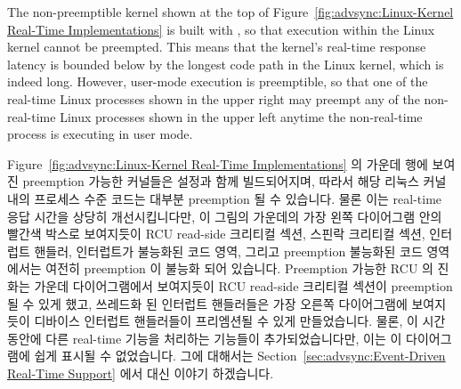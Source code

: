 The non-preemptible kernel shown at the top of
Figure~\ref{fig:advsync:Linux-Kernel Real-Time Implementations}
is built with , so that execution within the Linux
kernel cannot be preempted.
This means that the kernel's real-time response latency is bounded below
by the longest code path in the Linux kernel, which is indeed long.
However, user-mode execution is preemptible, so that one of the
real-time Linux processes shown in the upper right may preempt any of the
non-real-time Linux processes shown in the upper left anytime the
non-real-time process is executing in user mode.
\fi

Figure~\ref{fig:advsync:Linux-Kernel Real-Time Implementations}
의 가운데 행에 보여진 preemption 가능한 커널들은  설정과
함께 빌드되어지며, 따라서 해당 리눅스 커널 내의 프로세스 수준 코드는 대부분
preemption 될 수 있습니다.
물론 이는 real-time 응답 시간을 상당히 개선시킵니다만, 이 그림의 가운데의 가장
왼쪽 다이어그램 안의 빨간색 박스로 보여지듯이 RCU read-side 크리티컬 섹션,
스핀락 크리티컬 섹션, 인터럽트 핸들러, 인터럽트가 불능화된 코드 영역, 그리고
preemption 불능화된 코드 영역에서는 여전히 preemption 이 불능화 되어 있습니다.
Preemption 가능한 RCU 의 진화는 가운데 다이어그램에서 보여지듯이 RCU read-side
크리티컬 섹션이 preemption 될 수 있게 했고, 쓰레드화 된 인터럽트 핸들러들은
가장 오른쪽 다이어그램에 보여지듯이 디바이스 인터럽트 핸들러들이 프리엠션될 수
있게 만들었습니다.
물론, 이 시간 동안에 다른 real-time 기능을 처리하는 기능들이 추가되었습니다만,
이는 이 다이어그램에 쉽게 표시될 수 없었습니다.
그에 대해서는
Section~\ref{sec:advsync:Event-Driven Real-Time Support} 에서 대신 이야기
하겠습니다.

